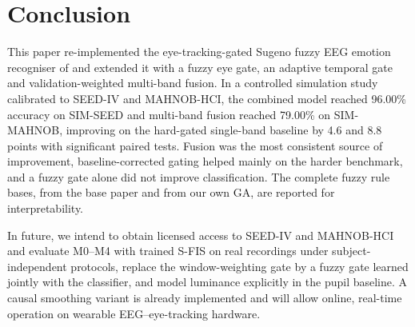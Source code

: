 \documentclass[10pt,twoside]{article}
\newcommand{\simseed}{SIM-SEED}
\newcommand{\simmah}{SIM-MAHNOB}
\begin{document}
\section{Conclusion}\label{sec:conclusion}
This paper re-implemented the eye-tracking-gated Sugeno fuzzy EEG emotion recogniser of \cite{FarhadiSedehi2024a} and extended it with a fuzzy eye gate, an adaptive temporal gate and validation-weighted multi-band fusion. In a controlled simulation study calibrated to SEED-IV and MAHNOB-HCI, the combined model reached 96.00\% accuracy on \simseed{} and multi-band fusion reached 79.00\% on \simmah{}, improving on the hard-gated single-band baseline by 4.6 and 8.8 points with significant paired tests. Fusion was the most consistent source of improvement, baseline-corrected gating helped mainly on the harder benchmark, and a fuzzy gate alone did not improve classification. The complete fuzzy rule bases, from the base paper and from our own GA, are reported for interpretability.

In future, we intend to obtain licensed access to SEED-IV and MAHNOB-HCI and evaluate M0--M4 with trained S-FIS on real recordings under subject-independent protocols, replace the window-weighting gate by a fuzzy gate learned jointly with the classifier, and model luminance explicitly in the pupil baseline. A causal smoothing variant is already implemented and will allow online, real-time operation on wearable EEG--eye-tracking hardware.
\end{document}
